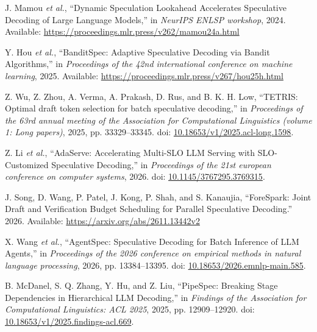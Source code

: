 \documentclass[11pt,a4paper,UTF8,fontset=none,scheme=plain,zihao=-4]{ctexart}
\newenvironment{CSLReferences}[2]{%
  \footnotesize
  \raggedright
  \setlength{\leftskip}{3em}%
  \setlength{\parindent}{-3em}%
  \setlength{\parskip}{0.1\baselineskip}%
  \sloppy
}{}
\newcommand{\CSLLeftMargin}[1]{\makebox[3em][l]{#1}}
\newcommand{\CSLRightInline}[1]{#1}
\begin{document}
\begin{CSLReferences}{0}{0}
\leavevmode{}%
\CSLLeftMargin{{[}44{]} }
\CSLRightInline{J. Mamou \emph{et al.}, {``{Dynamic Speculation
Lookahead Accelerates Speculative Decoding of Large Language Models},''}
in \emph{NeurIPS ENLSP workshop}, 2024. Available:
\url{https://proceedings.mlr.press/v262/mamou24a.html}}

\leavevmode{}%
\CSLLeftMargin{{[}45{]} }
\CSLRightInline{Y. Hou \emph{et al.}, {``{BanditSpec: Adaptive
Speculative Decoding via Bandit Algorithms},''} in \emph{Proceedings of
the 42nd international conference on machine learning}, 2025. Available:
\url{https://proceedings.mlr.press/v267/hou25h.html}}

\leavevmode{}%
\CSLLeftMargin{{[}46{]} }
\CSLRightInline{Z. Wu, Z. Zhou, A. Verma, A. Prakash, D. Rus, and B. K.
H. Low, {``TETRIS: Optimal draft token selection for batch speculative
decoding,''} in \emph{Proceedings of the 63rd annual meeting of the
{A}ssociation for {C}omputational {L}inguistics (volume 1: Long
papers)}, 2025, pp. 33329--33345. doi:
\href{https://doi.org/10.18653/v1/2025.acl-long.1598}{10.18653/v1/2025.acl-long.1598}.}

\leavevmode{}%
\CSLLeftMargin{{[}47{]} }
\CSLRightInline{Z. Li \emph{et al.}, {``{AdaServe: Accelerating
Multi-SLO LLM Serving with SLO-Customized Speculative Decoding},''} in
\emph{Proceedings of the 21st european conference on computer systems},
2026. doi:
\href{https://doi.org/10.1145/3767295.3769315}{10.1145/3767295.3769315}.}

\leavevmode{}%
\CSLLeftMargin{{[}48{]} }
\CSLRightInline{J. Song, D. Wang, P. Patel, J. Kong, P. Shah, and S.
Kanaujia, {``{ForeSpark: Joint Draft and Verification Budget Scheduling
for Parallel Speculative Decoding}.''} 2026. Available:
\url{https://arxiv.org/abs/2611.13442v2}}

\leavevmode{}%
\CSLLeftMargin{{[}49{]} }
\CSLRightInline{X. Wang \emph{et al.}, {``{AgentSpec: Speculative
Decoding for Batch Inference of LLM Agents},''} in \emph{Proceedings of
the 2026 conference on empirical methods in natural language
processing}, 2026, pp. 13384--13395. doi:
\href{https://doi.org/10.18653/2026.emnlp-main.585}{10.18653/2026.emnlp-main.585}.}

\leavevmode{}%
\CSLLeftMargin{{[}50{]} }
\CSLRightInline{B. McDanel, S. Q. Zhang, Y. Hu, and Z. Liu,
{``{PipeSpec: Breaking Stage Dependencies in Hierarchical LLM
Decoding},''} in \emph{Findings of the {A}ssociation for {C}omputational
{L}inguistics: {ACL} 2025}, 2025, pp. 12909--12920. doi:
\href{https://doi.org/10.18653/v1/2025.findings-acl.669}{10.18653/v1/2025.findings-acl.669}.}


\end{CSLReferences}
\end{document}
